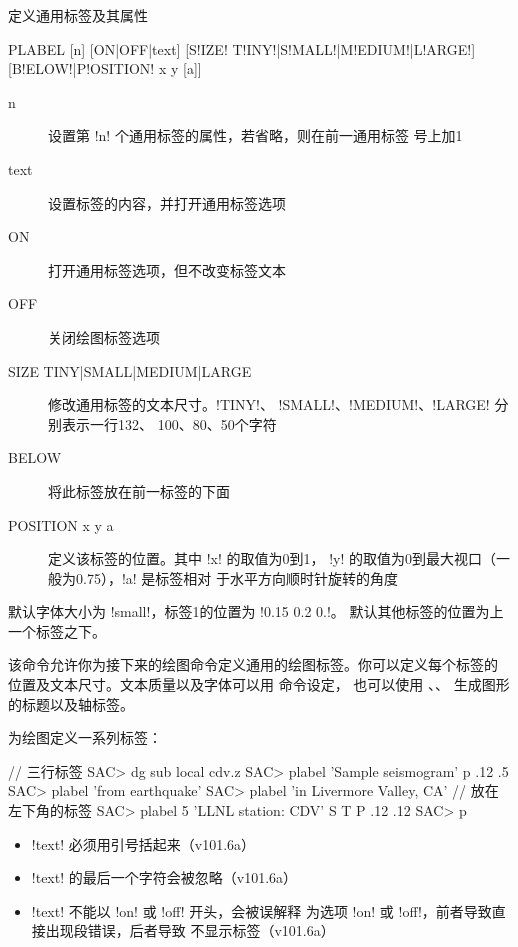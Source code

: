 \label{cmd:plabel}

定义通用标签及其属性

\begin{SACSTX}
PLABEL [n] [ON|OFF|text] [S!IZE! T!INY!|S!MALL!|M!EDIUM!|L!ARGE!]
    [B!ELOW!|P!OSITION! x y [a]]
\end{SACSTX}

\begin{description}
\item [n] 设置第 !n! 个通用标签的属性，若省略，则在前一通用标签
    号上加1
\item [text] 设置标签的内容，并打开通用标签选项
\item [ON] 打开通用标签选项，但不改变标签文本
\item [OFF] 关闭绘图标签选项
\item [SIZE TINY|SMALL|MEDIUM|LARGE] 修改通用标签的文本尺寸。!TINY!、
    !SMALL!、!MEDIUM!、!LARGE! 分别表示一行132、
    100、80、50个字符
\item [BELOW] 将此标签放在前一标签的下面
\item [POSITION x y a] 定义该标签的位置。其中 !x! 的取值为0到1，
    !y! 的取值为0到最大视口（一般为0.75），!a! 是标签相对
    于水平方向顺时针旋转的角度
\end{description}

默认字体大小为 !small!，标签1的位置为 !0.15 0.2 0.!。
默认其他标签的位置为上一个标签之下。

该命令允许你为接下来的绘图命令定义通用的绘图标签。你可以定义每个标签的
位置及文本尺寸。文本质量以及字体可以用  命令设定，
也可以使用 、、
生成图形的标题以及轴标签。

为绘图定义一系列标签：
\begin{SACCode}
// 三行标签
SAC> dg sub local cdv.z
SAC> plabel 'Sample seismogram' p .12 .5
SAC> plabel 'from earthquake'
SAC> plabel 'in Livermore Valley, CA'
// 放在左下角的标签
SAC> plabel 5 'LLNL station: CDV' S T P .12 .12
SAC> p
\end{SACCode}

\begin{itemize}
\item !text! 必须用引号括起来（v101.6a）
\item !text! 的最后一个字符会被忽略（v101.6a）
\item !text! 不能以 !on! 或 !off! 开头，会被误解释
    为选项 !on! 或 !off!，前者导致直接出现段错误，后者导致
    不显示标签（v101.6a）
\end{itemize}
